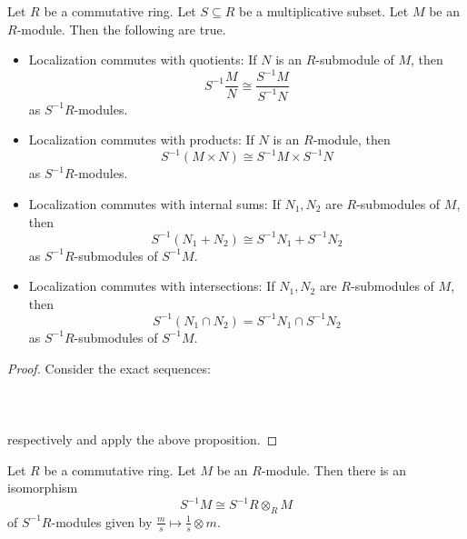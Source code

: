 \documentclass[a4paper]{article}
\begin{document}
\begin{crl}{}{} Let $R$ be a commutative ring. Let $S\subseteq R$ be a multiplicative subset. Let $M$ be an $R$-module. Then the following are true. 
\begin{itemize}
\item Localization commutes with quotients: If $N$ is an $R$-submodule of $M$, then $$S^{-1}\frac{M}{N}\cong\frac{S^{-1}M}{S^{-1}N}$$ as $S^{-1}R$-modules. 
\item Localization commutes with products: If $N$ is an $R$-module, then $$S^{-1}(M\times N)\cong S^{-1}M\times S^{-1}N$$ as $S^{-1}R$-modules. 
\item Localization commutes with internal sums: If $N_1,N_2$ are $R$-submodules of $M$, then $$S^{-1}(N_1+N_2)\cong S^{-1}N_1+S^{-1}N_2$$ as $S^{-1}R$-submodules of $S^{-1}M$. 
\item Localization commutes with intersections: If $N_1,N_2$ are $R$-submodules of $M$, then $$S^{-1}(N_1\cap N_2)=S^{-1}N_1\cap S^{-1}N_2$$ as $S^{-1}R$-submodules of $S^{-1}M$. 
\end{itemize} \tcbline
\begin{proof}
Consider the exact sequences: \\~\\
\\~\\
respectively and apply the above proposition. 
\end{proof}
\end{crl}

\begin{prp}{}{} Let $R$ be a commutative ring. Let $M$ be an $R$-module. Then there is an isomorphism $$S^{-1}M\cong S^{-1}R\otimes_RM$$ of $S^{-1}R$-modules given by $\frac{m}{s}\mapsto\frac{1}{s}\otimes m$. 
\end{prp}
\end{document}
